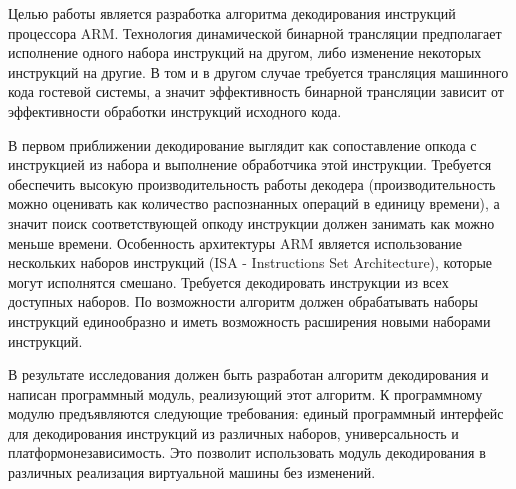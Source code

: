 
Целью работы является разработка алгоритма декодирования инструкций процессора ARM. Технология динамической бинарной трансляции предполагает исполнение одного набора инструкций на другом, либо изменение некоторых инструкций на другие. В том и в другом случае требуется трансляция машинного кода гостевой системы, а значит эффективность бинарной трансляции зависит от эффективности обработки инструкций исходного кода.

В первом приближении декодирование выглядит как сопоставление опкода с инструкцией из набора и выполнение обработчика этой инструкции. Требуется обеспечить высокую производительность работы декодера (производительность можно оценивать как количество распознанных операций в единицу времени), а значит поиск соответствующей опкоду инструкции должен занимать как можно меньше времени. Особенность архитектуры ARM является использование нескольких наборов инструкций (ISA - Instructions Set Architecture), которые могут исполнятся смешано. Требуется декодировать инструкции из всех доступных наборов. По возможности алгоритм должен обрабатывать наборы инструкций единообразно и иметь возможность расширения новыми наборами инструкций.

В результате исследования должен быть разработан алгоритм декодирования и написан программный модуль, реализующий этот алгоритм. К программному модулю предъявляются следующие требования: единый программный интерфейс для декодирования инструкций из различных наборов, универсальность и платформонезависимость. Это позволит использовать модуль декодирования в различных реализация виртуальной машины без изменений.




